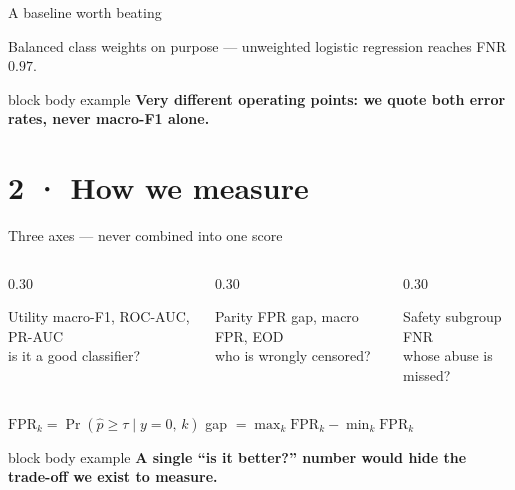 \documentclass[aspectratio=169,11pt,xcolor={table}]{beamer}
\newcommand{\thespeaker}{}
\newcommand{\takeaway}[1]{%
  \vspace{0.6ex}%
  \begin{beamercolorbox}[wd=\textwidth,sep=1.0ex,rounded=true]{block body example}%
    \small\textbf{#1}%
  \end{beamercolorbox}}
\newcommand{\hint}[1]{{\footnotesize\color{fairgrey}#1}}
\begin{document}
\begin{frame}{A baseline worth beating}
  \vspace{2.4ex}
  \begin{center}
    \small
    
  \end{center}
  \vspace{2.4ex}
  \centerline{\small Balanced class weights on purpose --- unweighted logistic
    regression reaches FNR $0.97$.}

  \takeaway{Very different operating points: we quote both error rates, never
    macro-F1 alone.}
\end{frame}

\renewcommand{\thespeaker}{Mirzayeva, Laman}
\section{2 · How we measure}

\begin{frame}{Three axes --- never combined into one score}
  \vspace{2.2ex}
  \begin{columns}[t,onlytextwidth]
    \begin{column}{0.30\textwidth}
      \begin{block}{Utility}
        \small macro-F1, ROC-AUC, PR-AUC\\[0.6ex]
        \hint{is it a good classifier?}
      \end{block}
    \end{column}
    \begin{column}{0.30\textwidth}
      \begin{block}{Parity}
        \small FPR gap, macro FPR, EOD\\[0.6ex]
        \hint{who is wrongly censored?}
      \end{block}
    \end{column}
    \begin{column}{0.30\textwidth}
      \begin{block}{Safety}
        \small subgroup FNR\\[0.6ex]
        \hint{whose abuse is missed?}
      \end{block}
    \end{column}
  \end{columns}

  \vspace{3.0ex}
  \centerline{$\mathrm{FPR}_k = \Pr(\hat p \geq \tau \mid y = 0,\, k)$
    \qquad gap $= \max_k \mathrm{FPR}_k - \min_k \mathrm{FPR}_k$}

  \takeaway{A single ``is it better?'' number would hide the trade-off we exist
    to measure.}
\end{frame}
\end{document}
